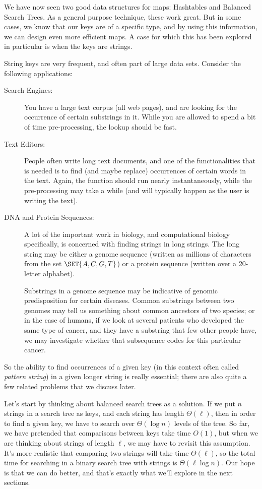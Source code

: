 We have now seen two good data structures for maps: Hashtables and
Balanced Search Trees. As a general purpose technique, these work
great. But in some cases, we know that our keys are of a specific
type, and by using this information, we can design even more efficient
maps. A case for which this has been explored in particular is when
the keys are strings.

String keys are very frequent, and often part of large data
sets. Consider the following applications:

\begin{description}
\item[Search Engines:] You have a large text corpus (all web pages),
  and are looking for the occurrence of certain substrings in
  it. While you are allowed to spend a bit of time pre-processing, the
  lookup should be fast.
\item[Text Editors:] People often write long text documents, and one
  of the functionalities that is needed is to find (and maybe replace)
  occurrences of certain words in the text. Again, the 
  function should run nearly instantaneously, while the pre-processing
  may take a while (and will typically happen as the user is writing
  the text).
\item[DNA and Protein Sequences:] A lot of the important work in
  biology, and computational biology specifically, is concerned with
  finding strings in long strings. The long string may be either a
  genome sequence (written as millions of characters from the set
  $\SET{A,C,G,T}$) or a protein sequence (written over a 20-letter
  alphabet). 

  Substrings in a genome sequence may be indicative of genomic
  predisposition for certain diseases. Common substrings between two
  genomes may tell us something about common ancestors of two species;
  or in the case of humans, if we look at several patients who
  developed the same type of cancer, and they have a substring that
  few other people have, we may investigate whether that subsequence
  codes for this particular cancer.
\end{description}

So the ability to find occurrences of a given key (in this context
often called \emph{pattern string}) in a given longer string is really
essential; there are also quite a few related problems that we discuss
later.

Let's start by thinking about balanced search trees as a solution. 
If we put $n$ strings in a search tree as keys, and each string has
length $\Theta(\ell)$, then in order to find a given key, we have to
search over $\Theta(\log n)$ levels of the tree. So far, we have
pretended that comparisons between keys take time $O(1)$, but when we
are thinking about strings of length $\ell$, we may have to revisit
this assumption. It's more realistic that comparing two strings will
take time $\Theta(\ell)$, so the total time for searching in a binary
search tree with strings is $\Theta(\ell \log n)$. Our hope is that we
can do better, and that's exactly what we'll explore in the next
sections.

